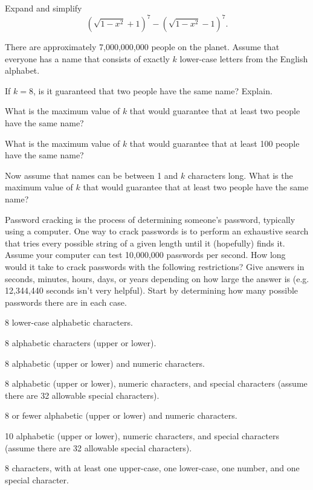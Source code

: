 
\begin{pro} Expand and simplify $$ (\sqrt{1 - x^2} + 1)^7 -
(\sqrt{1 - x^2} - 1)^7.$$\end{pro}
\begin{pro}
There are approximately 7,000,000,000 people on the planet.
Assume that everyone has a name that consists of exactly $k$ 
lower-case letters from the English alphabet.
\begin{lenum}
\item
If $k=8$, is it guaranteed that two people have the same name?  Explain.
\item
What is the maximum value of $k$ that would guarantee that at least two people have the same name?
\item
What is the maximum value of $k$ that would guarantee that at least 100 people have the same name?
\item
Now assume that names can be between 1 and $k$ characters long.
What is the maximum value of $k$ that would guarantee that at least two people have the same name?
\end{lenum}
\end{pro}
\begin{pro}
Password cracking is the process of determining someone's password, typically using a computer.
One way to crack passwords is to perform an exhaustive search that tries every possible 
string of a given length until it (hopefully) finds it.
Assume your computer can test 10,000,000 passwords per second.
How long would it take to crack passwords with the following restrictions? Give answers in seconds,
minutes, hours, days, or years depending on how large the answer is (e.g. 12,344,440 seconds isn't 
very helpful).  Start by determining how many possible passwords there are in each case.
\begin{lenum}
\item
8 lower-case alphabetic characters.
\item
8 alphabetic characters (upper or lower).
\item
8 alphabetic (upper or lower) and numeric characters.
\item
8 alphabetic (upper or lower), numeric characters, and special characters 
(assume there are 32 allowable special characters).
\item
8 or fewer alphabetic (upper or lower) and numeric characters.
\item
10 alphabetic (upper or lower), numeric characters, and special characters 
(assume there are 32 allowable special characters).
\item
8 characters, with at least one upper-case, one lower-case, one number, and one special character. 
\end{lenum}
\end{pro}
